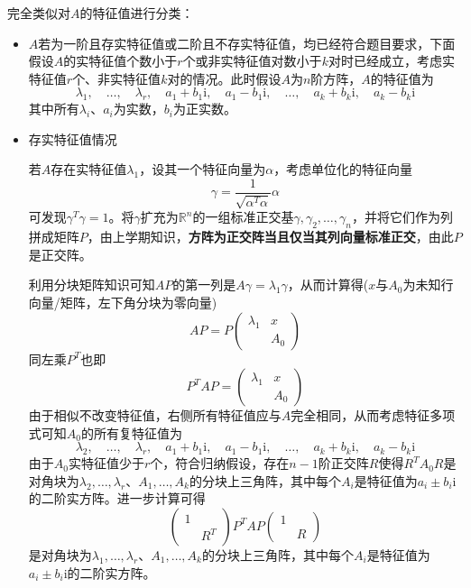 \documentclass[a4paper,UTF8,fontset=windows,AutoFakeBold]{ctexart}
\newcommand*{\ir}{\mathrm{i}}
\begin{document}
\begin{enumerate}
\begin{enumerate}
        完全类似对$A$的特征值进行分类：
        \begin{itemize}
            \item $A$若为一阶且存实特征值或二阶且不存实特征值，均已经符合题目要求，下面假设$A$的实特征值个数小于$r$个或非实特征值对数小于$k$对时已经成立，考虑实特征值$r$个、非实特征值$k$对的情况。此时假设$A$为$n$阶方阵，$A$的特征值为
            $$\lambda_1,\quad\dots,\quad\lambda_r,\quad a_1+b_1\ir,\quad a_1-b_1\ir,\quad\dots,\quad a_k+b_k\ir,\quad a_k-b_k\ir$$
            其中所有$\lambda_i$、$a_i$为实数，$b_i$为正实数。

            \item 存实特征值情况
            
            若$A$存在实特征值$\lambda_1$，设其一个特征向量为$\alpha$，考虑单位化的特征向量
            $$\gamma=\frac{1}{\sqrt{\alpha^T\alpha}}\alpha$$
            可发现$\gamma^T\gamma=1$。将$\gamma$扩充为$\mathbb{R}^n$的一组标准正交基$\gamma,\gamma_2,\dots,\gamma_n$，并将它们作为列拼成矩阵$P$，由上学期知识，\textbf{方阵为正交阵当且仅当其列向量标准正交}，由此$P$是正交阵。

            利用分块矩阵知识可知$AP$的第一列是$A\gamma=\lambda_1\gamma$，从而计算得($x$与$A_0$为未知行向量/矩阵，左下角分块为零向量)
            $$AP=P\begin{pmatrix}\lambda_1&x\\ &A_0\end{pmatrix}$$
            同左乘$P^T$也即
            $$P^TAP=\begin{pmatrix}\lambda_1&x\\ &A_0\end{pmatrix}$$
            由于相似不改变特征值，右侧所有特征值应与$A$完全相同，从而考虑特征多项式可知$A_0$的所有复特征值为
            $$\lambda_2,\quad\dots,\quad\lambda_r,\quad a_1+b_1\ir,\quad a_1-b_1\ir,\quad\dots,\quad a_k+b_k\ir,\quad a_k-b_k\ir$$
            由于$A_0$实特征值少于$r$个，符合归纳假设，存在$n-1$阶正交阵$R$使得$R^TA_0R$是对角块为$\lambda_2,\dots,\lambda_r$、$A_1,\dots,A_k$的分块上三角阵，其中每个$A_i$是特征值为$a_i\pm b_i\ir$的二阶实方阵。进一步计算可得
            $$\begin{pmatrix}1&\\ &R^T\end{pmatrix}P^TAP\begin{pmatrix}1&\\ &R\end{pmatrix}$$
            是对角块为$\lambda_1,\dots,\lambda_r$、$A_1,\dots,A_k$的分块上三角阵，其中每个$A_i$是特征值为$a_i\pm b_i\ir$的二阶实方阵。


\end{itemize}
\end{enumerate}
\end{enumerate}
\end{document}
